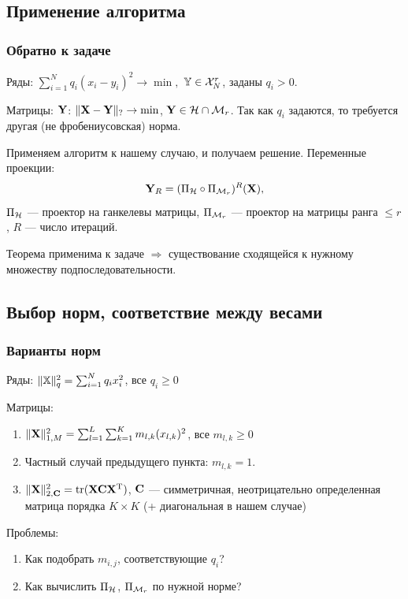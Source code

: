 \documentclass[unicode, notheorems]{beamer}
\begin{document}
\subsection{Применение алгоритма}
\begin{frame}
	\frametitle{Обратно к задаче}
	Ряды: $\sum \limits_{i=1}^N q_i(x_i - y_i)^2 \to \min,$ $\mathbb{Y} \in \mathcal{X}_N^r$, заданы $q_i > 0$.
	
	Матрицы: $\mathbf{Y}$: $\|\mathbf{X} - \mathbf{Y}\|_? \to \min$, $\mathbf{Y} \in \mathcal{H} \cap \mathcal{M}_r$. Так как $q_i$ задаются, то требуется другая (не фробениусовская)  норма.
	
	\vspace{0.3cm}
	Применяем алгоритм к нашему случаю, и получаем решение. Переменные проекции: 
	\begin{equation*}
	\mathbf{Y}_R = (\Pi_{\mathcal{H}} \circ \Pi_{\mathcal{M}_r})^R (\mathbf{X}),
	\end{equation*}
	$\Pi_{\mathcal{H}}$ --- проектор на ганкелевы матрицы, $\Pi_{\mathcal{M}_r}$ --- проектор на матрицы ранга $\le r$, $R$ --- число итераций.
	
	Теорема применима к задаче $\Rightarrow$ существование сходящейся к нужному множеству подпоследовательности.
\end{frame}

\subsection{Выбор норм, соответствие между весами}
\begin{frame}
	\frametitle{Варианты норм}
	Ряды:
	$\|\mathbb{X}\|_q^2 = \sum_{i = 1}^N q_i x_i^2$, все $q_i \ge 0$
	
	\vspace{0.4cm}
	Матрицы:
		\begin{enumerate}
			\item $\|\mathbf{X}\|_{1, M}^2 = \sum_{l = 1}^L \sum_{k = 1}^K m_{l, k} (x_{l, k})^2$, все $m_{l, k} \ge 0$
			\item Частный случай предыдущего пункта: $m_{l, k} = 1$.
			\item $\|\mathbf{X}\|_{2, \mathbf{C}}^2 = \text{tr}(\mathbf{X} \mathbf{C} \mathbf{X}^{\mathrm{T}})$, $\mathbf{C}$ --- симметричная, неотрицательно определенная матрица порядка $K \times K$ (+ диагональная в нашем случае)
		\end{enumerate}
		
		\vspace{0.4cm}
		Проблемы:
		\begin{enumerate}
			\item Как подобрать $m_{i, j}$, соответствующие $q_i$?
			\item Как вычислить $\Pi_{\mathcal{H}}$, $\Pi_{\mathcal{M}_r}$ по нужной норме?
		\end{enumerate}
\end{frame}
\end{document}
